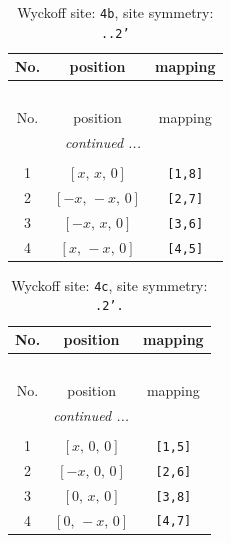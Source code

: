 \documentclass[fleqn,8pt]{jsarticle}
\begin{document}
\begin{longtable}{ccc}
\caption{Wyckoff site: {\tt 4b}, site symmetry: {\tt ..2'}}
 \\
 \hline \hline
No. & position & mapping \\ \hline \endfirsthead

\multicolumn{2}{l}{\tablename\ \thetable{}} \\
 \hline \hline
No. & position & mapping \\ \hline \endhead

 \hline \hline
\multicolumn{2}{r}{\footnotesize\it continued ...} \\ \endfoot

 \hline \hline
\multicolumn{2}{r}{} \\ \endlastfoot

1 & $\left[ x,\, x,\, 0 \right]$ & {\tt [1,8]} \\ \hline
2 & $\left[ - x,\, - x,\, 0 \right]$ & {\tt [2,7]} \\ \hline
3 & $\left[ - x,\, x,\, 0 \right]$ & {\tt [3,6]} \\ \hline
4 & $\left[ x,\, - x,\, 0 \right]$ & {\tt [4,5]} \\
\end{longtable}
\renewcommand{\arraystretch}{1.2}
\begin{longtable}{ccc}
\caption{Wyckoff site: {\tt 4c}, site symmetry: {\tt .2'.}}
 \\
 \hline \hline
No. & position & mapping \\ \hline \endfirsthead

\multicolumn{2}{l}{\tablename\ \thetable{}} \\
 \hline \hline
No. & position & mapping \\ \hline \endhead

 \hline \hline
\multicolumn{2}{r}{\footnotesize\it continued ...} \\ \endfoot

 \hline \hline
\multicolumn{2}{r}{} \\ \endlastfoot

1 & $\left[ x,\, 0,\, 0 \right]$ & {\tt [1,5]} \\ \hline
2 & $\left[ - x,\, 0,\, 0 \right]$ & {\tt [2,6]} \\ \hline
3 & $\left[ 0,\, x,\, 0 \right]$ & {\tt [3,8]} \\ \hline
4 & $\left[ 0,\, - x,\, 0 \right]$ & {\tt [4,7]} \\
\end{longtable}
\renewcommand{\arraystretch}{1.2}
\end{document}
